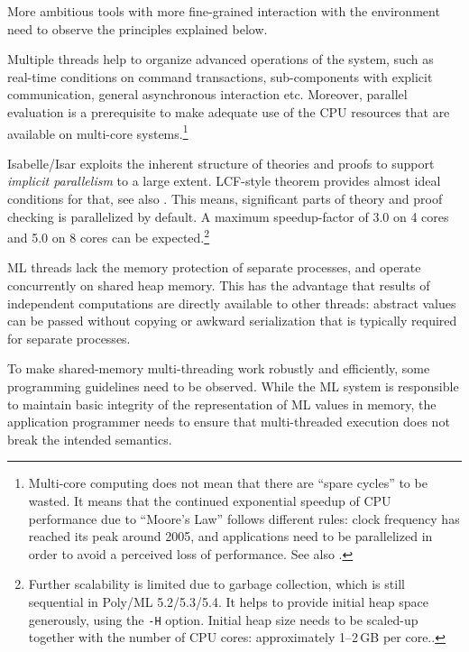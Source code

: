 \begin{isabellebody}
\begin{isamarkuptext}
  More ambitious tools with more fine-grained interaction with the
  environment need to observe the principles explained below.%
\end{isamarkuptext}%
\isamarkuptrue%
%
\isamarkuptrue%
%
\begin{isamarkuptext}%
Multiple threads help to organize advanced operations of the
  system, such as real-time conditions on command transactions,
  sub-components with explicit communication, general asynchronous
  interaction etc.  Moreover, parallel evaluation is a prerequisite to
  make adequate use of the CPU resources that are available on
  multi-core systems.\footnote{Multi-core computing does not mean that
  there are ``spare cycles'' to be wasted.  It means that the
  continued exponential speedup of CPU performance due to ``Moore's
  Law'' follows different rules: clock frequency has reached its peak
  around 2005, and applications need to be parallelized in order to
  avoid a perceived loss of performance.  See also
  \cite{Sutter:2005}.}

  Isabelle/Isar exploits the inherent structure of theories and proofs
  to support \emph{implicit parallelism} to a large extent.  LCF-style
  theorem provides almost ideal conditions for that, see also
  \cite{Wenzel:2009}.  This means, significant parts of theory and
  proof checking is parallelized by default.  A maximum speedup-factor
  of 3.0 on 4 cores and 5.0 on 8 cores can be
  expected.\footnote{Further scalability is limited due to garbage
  collection, which is still sequential in Poly/ML 5.2/5.3/5.4.  It
  helps to provide initial heap space generously, using the
  \texttt{-H} option.  Initial heap size needs to be scaled-up
  together with the number of CPU cores: approximately 1--2\,GB per
  core..}

  \medskip ML threads lack the memory protection of separate
  processes, and operate concurrently on shared heap memory.  This has
  the advantage that results of independent computations are directly
  available to other threads: abstract values can be passed without
  copying or awkward serialization that is typically required for
  separate processes.

  To make shared-memory multi-threading work robustly and efficiently,
  some programming guidelines need to be observed.  While the ML
  system is responsible to maintain basic integrity of the
  representation of ML values in memory, the application programmer
  needs to ensure that multi-threaded execution does not break the
  intended semantics.


\end{isamarkuptext}
\end{isabellebody}
